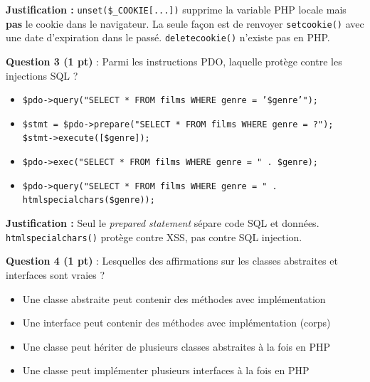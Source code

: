 \documentclass[11pt,a4paper]{article}
\newcommand{\cbv}{\textcolor{correctgreen}{$\boxtimes$}\ }  %
\newcommand{\cbx}{\textcolor{wrongred}{$\square$}\ }         %
\begin{document}
\begin{tcolorbox}[notebox]
\textbf{Justification :} \texttt{unset(\$\_COOKIE[...])} supprime la variable PHP locale mais \textbf{pas} le cookie dans le navigateur. La seule façon est de renvoyer \texttt{setcookie()} avec une date d'expiration dans le passé. \texttt{deletecookie()} n'existe pas en PHP.
\end{tcolorbox}

\vspace{8pt}

\noindent\textbf{Question 3 (1 pt)} : Parmi les instructions PDO, laquelle protège contre les injections SQL ?

\begin{itemize}[leftmargin=2em, itemsep=4pt, topsep=4pt]
  \item[\cbx] \texttt{\$pdo->query("SELECT * FROM films WHERE genre = '\$genre'");}
  \item[\cbv] \texttt{\$stmt = \$pdo->prepare("SELECT * FROM films WHERE genre = ?"); \$stmt->execute([\$genre]);}
  \item[\cbx] \texttt{\$pdo->exec("SELECT * FROM films WHERE genre = " . \$genre);}
  \item[\cbx] \texttt{\$pdo->query("SELECT * FROM films WHERE genre = " . htmlspecialchars(\$genre));}
\end{itemize}

\begin{tcolorbox}[notebox]
\textbf{Justification :} Seul le \textit{prepared statement} sépare code SQL et données. \texttt{htmlspecialchars()} protège contre XSS, pas contre SQL injection.
\end{tcolorbox}

\vspace{8pt}

\noindent\textbf{Question 4 (1 pt)} : Lesquelles des affirmations sur les classes abstraites et interfaces sont vraies ?

\begin{itemize}[leftmargin=2em, itemsep=4pt, topsep=4pt]
  \item[\cbv] Une classe abstraite peut contenir des méthodes avec implémentation
  \item[\cbx] Une interface peut contenir des méthodes avec implémentation (corps)
  \item[\cbx] Une classe peut hériter de plusieurs classes abstraites à la fois en PHP
  \item[\cbv] Une classe peut implémenter plusieurs interfaces à la fois en PHP
\end{itemize}
\end{document}
